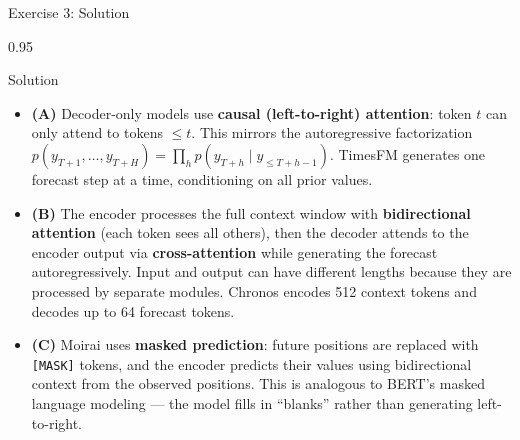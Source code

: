 \documentclass[9pt, aspectratio=169, t]{beamer}
\begin{document}
\begin{frame}{Exercise 3: Solution}
    \begin{cminipage}{0.95\textwidth}
    \begin{exampleblock}{Solution}
        {\small
        \begin{itemize}\setlength{\itemsep}{3pt}
            \item \textcolor{MainBlue}{\textbf{(A)}} Decoder-only models use \textbf{causal (left-to-right) attention}: token $t$ can only attend to tokens $\leq t$. This mirrors the autoregressive factorization $p(y_{T+1}, \ldots, y_{T+H}) = \prod_h p(y_{T+h} \mid y_{\leq T+h-1})$. TimesFM generates one forecast step at a time, conditioning on all prior values.
            \item \textcolor{MainBlue}{\textbf{(B)}} The encoder processes the full context window with \textbf{bidirectional attention} (each token sees all others), then the decoder attends to the encoder output via \textbf{cross-attention} while generating the forecast autoregressively. Input and output can have different lengths because they are processed by separate modules. Chronos encodes 512 context tokens and decodes up to 64 forecast tokens.
            \item \textcolor{MainBlue}{\textbf{(C)}} Moirai uses \textbf{masked prediction}: future positions are replaced with \texttt{[MASK]} tokens, and the encoder predicts their values using bidirectional context from the observed positions. This is analogous to BERT's masked language modeling --- the model fills in ``blanks'' rather than generating left-to-right.
        \end{itemize}
        }
    \end{exampleblock}
    \end{cminipage}
\end{frame}
\end{document}
